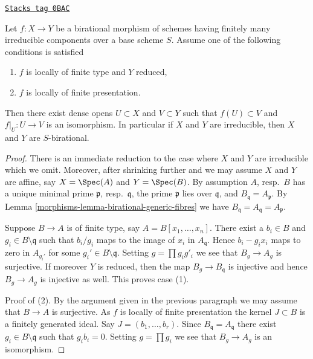 \begin{lemma}
\label{morphisms-lemma-birational-birational}
\href{https://stacks.math.columbia.edu/tag/0BAC}{\texttt{Stacks tag 0BAC}}

Let $f : X \to Y$ be a birational morphism of schemes having finitely
many irreducible components over a base scheme $S$. Assume one of the
following conditions is satisfied
\begin{enumerate}
\item $f$ is locally of finite type and $Y$ reduced,
\item $f$ is locally of finite presentation.
\end{enumerate}
Then there exist dense opens $U \subset X$ and $V \subset Y$
such that $f(U) \subset V$ and $f|_U : U \to V$ is an isomorphism.
In particular if $X$ and $Y$ are irreducible, then
$X$ and $Y$ are $S$-birational.
\end{lemma}

\begin{proof}

There is an immediate reduction to the case where $X$ and $Y$ are irreducible
which we omit. Moreover, after shrinking further and we may assume $X$ and
$Y$ are affine, say $X = \Spec(A)$ and $Y = \Spec(B)$.
By assumption $A$, resp.\ $B$ has a unique minimal prime $\mathfrak p$,
resp.\ $\mathfrak q$, the prime $\mathfrak p$ lies over $\mathfrak q$, and
$B_\mathfrak q = A_\mathfrak p$.
By Lemma \ref{morphisms-lemma-birational-generic-fibres} we have
$B_\mathfrak q = A_\mathfrak q = A_\mathfrak p$.

\medskip\noindent
Suppose $B \to A$ is of finite type, say $A = B[x_1, \ldots, x_n]$.
There exist a $b_i \in B$ and $g_i \in B \setminus \mathfrak q$
such that $b_i/g_i$ maps to the image of $x_i$ in $A_\mathfrak q$.
Hence $b_i  - g_ix_i$ maps to zero in $A_{g_i'}$ for some
$g_i' \in B \setminus \mathfrak q$. Setting $g = \prod g_i g'_i$
we see that $B_g \to A_g$ is surjective. If moreover $Y$ is reduced,
then the map $B_g \to B_\mathfrak q$ is injective and hence
$B_g \to A_g$ is injective as well. This proves case (1).

\medskip\noindent
Proof of (2). By the argument given in the previous paragraph we may
assume that $B \to A$ is surjective. As $f$ is locally of finite presentation
the kernel $J \subset B$ is a finitely generated ideal. Say
$J = (b_1, \ldots, b_r)$. Since $B_\mathfrak q = A_\mathfrak q$
there exist $g_i \in B \setminus \mathfrak q$ such that
$g_i b_i = 0$. Setting $g = \prod g_i$ we see that $B_g \to A_g$
is an isomorphism.
\end{proof}

